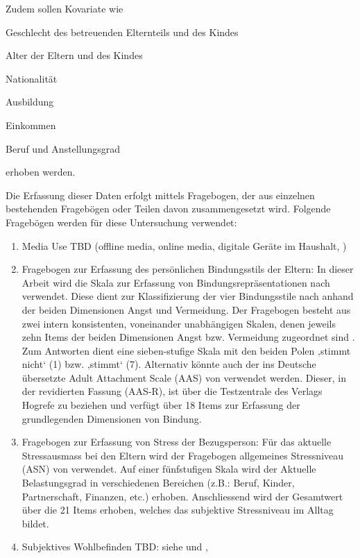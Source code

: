 Zudem sollen Kovariate wie 
\begin{seriate}
    \item Geschlecht des betreuenden Elternteils und des Kindes
    \item Alter der Eltern und des Kindes
    \item Nationalität
    \item Ausbildung
    \item Einkommen
    \item Beruf und Anstellungsgrad
\end{seriate}
erhoben werden.

Die Erfassung dieser Daten erfolgt mittels Fragebogen, der aus einzelnen bestehenden Fragebögen oder Teilen davon zusammengesetzt wird. Folgende Fragebögen werden für diese Untersuchung verwendet:
\begin{enumerate}
    \item Media Use TBD (offline media, online media, digitale Geräte im Haushalt, )
    \item Fragebogen zur Erfassung des persönlichen Bindungsstils der Eltern: 
In dieser Arbeit wird die Skala zur Erfassung von Bindungsrepräsentationen nach  verwendet. Diese dient zur Klassifizierung der vier Bindungsstile nach  anhand der beiden Dimensionen Angst und Vermeidung. Der Fragebogen besteht aus zwei intern konsistenten, voneinander unabhängigen Skalen, denen jeweils zehn Items der beiden Dimensionen Angst bzw. Vermeidung zugeordnet sind \cite{Baadte2006}. Zum Antworten dient eine sieben-stufige Skala mit den beiden Polen ‚stimmt nicht‘ (1) bzw. ‚stimmt‘ (7). Alternativ könnte auch der ins Deutsche übersetzte Adult Attachment Scale (AAS) von  verwendet werden. Dieser, in der revidierten Fassung (AAS-R),  ist über die Testzentrale des Verlags Hogrefe zu beziehen und verfügt über 18 Items zur Erfassung der grundlegenden Dimensionen von Bindung.
    \item Fragebogen zur Erfassung von Stress der Bezugsperson: Für das aktuelle Stressausmass bei den Eltern wird der Fragebogen allgemeines Stressniveau (ASN) von  verwendet. Auf einer fünfstufigen Skala wird der Aktuelle Belastungsgrad in verschiedenen Bereichen (z.B.: Beruf, Kinder, Partnerschaft, Finanzen, etc.) erhoben. Anschliessend wird der Gesamtwert über die 21 Items erhoben, welches das subjektive Stressniveau im Alltag bildet.
    
    \item Subjektives Wohlbefinden TBD: siehe \cite{AmericanAcademyofPediatrics2013} und \cite{Plowman2014}, \cite{Nikken2014}
\end{enumerate}


